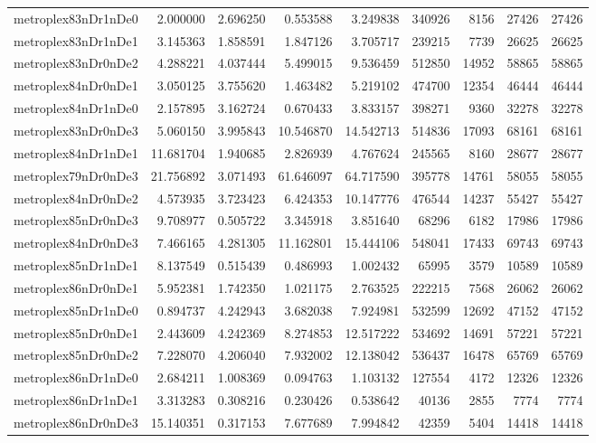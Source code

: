 \begin{longtable}{|l|r|r|r|r|r|r|r|r|}
metroplex83nDr1nDe0 & 2.000000 & 2.696250 & 0.553588 & 3.249838 & 340926 & 8156 & 27426 & 27426 \\
metroplex83nDr1nDe1 & 3.145363 & 1.858591 & 1.847126 & 3.705717 & 239215 & 7739 & 26625 & 26625 \\
metroplex83nDr0nDe2 & 4.288221 & 4.037444 & 5.499015 & 9.536459 & 512850 & 14952 & 58865 & 58865 \\
metroplex84nDr0nDe1 & 3.050125 & 3.755620 & 1.463482 & 5.219102 & 474700 & 12354 & 46444 & 46444 \\
metroplex84nDr1nDe0 & 2.157895 & 3.162724 & 0.670433 & 3.833157 & 398271 & 9360 & 32278 & 32278 \\
metroplex83nDr0nDe3 & 5.060150 & 3.995843 & 10.546870 & 14.542713 & 514836 & 17093 & 68161 & 68161 \\
metroplex84nDr1nDe1 & 11.681704 & 1.940685 & 2.826939 & 4.767624 & 245565 & 8160 & 28677 & 28677 \\
metroplex79nDr0nDe3 & 21.756892 & 3.071493 & 61.646097 & 64.717590 & 395778 & 14761 & 58055 & 58055 \\
metroplex84nDr0nDe2 & 4.573935 & 3.723423 & 6.424353 & 10.147776 & 476544 & 14237 & 55427 & 55427 \\
metroplex85nDr0nDe3 & 9.708977 & 0.505722 & 3.345918 & 3.851640 & 68296 & 6182 & 17986 & 17986 \\
metroplex84nDr0nDe3 & 7.466165 & 4.281305 & 11.162801 & 15.444106 & 548041 & 17433 & 69743 & 69743 \\
metroplex85nDr1nDe1 & 8.137549 & 0.515439 & 0.486993 & 1.002432 & 65995 & 3579 & 10589 & 10589 \\
metroplex86nDr0nDe1 & 5.952381 & 1.742350 & 1.021175 & 2.763525 & 222215 & 7568 & 26062 & 26062 \\
metroplex85nDr1nDe0 & 0.894737 & 4.242943 & 3.682038 & 7.924981 & 532599 & 12692 & 47152 & 47152 \\
metroplex85nDr0nDe1 & 2.443609 & 4.242369 & 8.274853 & 12.517222 & 534692 & 14691 & 57221 & 57221 \\
metroplex85nDr0nDe2 & 7.228070 & 4.206040 & 7.932002 & 12.138042 & 536437 & 16478 & 65769 & 65769 \\
metroplex86nDr1nDe0 & 2.684211 & 1.008369 & 0.094763 & 1.103132 & 127554 & 4172 & 12326 & 12326 \\
metroplex86nDr1nDe1 & 3.313283 & 0.308216 & 0.230426 & 0.538642 & 40136 & 2855 & 7774 & 7774 \\
metroplex86nDr0nDe3 & 15.140351 & 0.317153 & 7.677689 & 7.994842 & 42359 & 5404 & 14418 & 14418 \\

\end{longtable}
